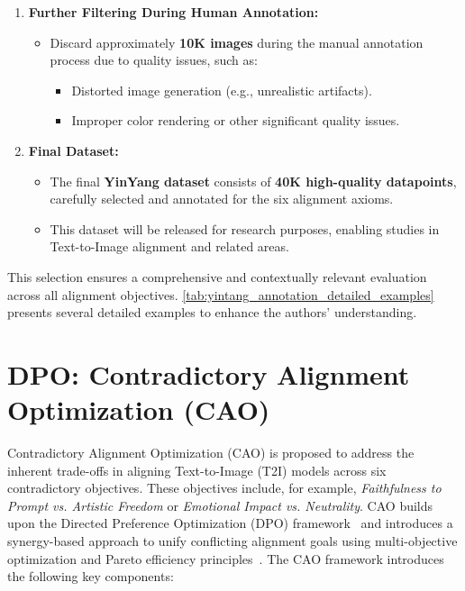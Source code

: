 \begin{enumerate}[label=\arabic*., leftmargin=1.5em]
    \item \textbf{Further Filtering During Human Annotation:}  
    \begin{itemize}
        \item Discard approximately \textbf{10K images} during the manual annotation process due to quality issues, such as:  
        \begin{itemize}
            \item Distorted image generation (e.g., unrealistic artifacts).  
            \item Improper color rendering or other significant quality issues.  
        \end{itemize}
    \end{itemize}

    \item \textbf{Final Dataset:}  
    \begin{itemize}
        \item The final \textbf{YinYang dataset} consists of \textbf{40K high-quality datapoints}, carefully selected and annotated for the six alignment axioms.  
        \item This dataset will be released for research purposes, enabling studies in Text-to-Image alignment and related areas.  
    \end{itemize}

\end{enumerate}

This selection ensures a comprehensive and contextually relevant evaluation across all alignment objectives. \cref{tab:yintang_annotation_detailed_examples} presents several detailed examples to enhance the authors' understanding.




\clearpage








\section{DPO: Contradictory Alignment Optimization (CAO)}
\label{sec:appendix:dpo-cao}

Contradictory Alignment Optimization (CAO) is proposed to address the inherent trade-offs in aligning Text-to-Image (T2I) models across six contradictory objectives. These objectives include, for example, \textit{Faithfulness to Prompt vs. Artistic Freedom} or \textit{Emotional Impact vs. Neutrality}. CAO builds upon the Directed Preference Optimization (DPO) framework~\cite{rafailov2024directpreferenceoptimizationlanguage} and introduces a synergy-based approach to unify conflicting alignment goals using multi-objective optimization and Pareto efficiency principles~\cite{miettinen1999nonlinear}. The CAO framework introduces the following key components:

